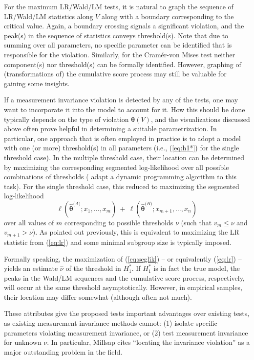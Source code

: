 \documentclass[man]{apa}
\begin{document}
For the maximum LR/Wald/LM tests, it is natural to graph the sequence of LR/Wald/LM
statistics along $V$ along with a boundary corresponding to the critical value.
Again, a boundary crossing signals a significant violation, and the peak(s) in the
sequence of statistics conveys threshold(s). Note that due to summing over all
parameters, no specific parameter can be identified that is responsible for the
violation. Similarly, for the Cram\'{e}r-von Mises test neither component(s) nor threshold(s)
can be formally identified. However, graphing of (transformations of) the cumulative
score process may still be valuable for gaining some insights.

If a measurement invariance violation is detected by any of the tests,
one may want to incorporate it into the model to account for it. How this should
be done typically depends on the type of violation ${\bm \theta}(V)$, and the visualizations
discussed above often prove helpful in determining a suitable parametrization.
In particular, one approach that is often employed in practice is to adopt a model
with one (or more) threshold(s) in all parameters (i.e., (\ref{eq:h1*}) for the
single threshold case). In the multiple threshold case, their location can
be determined by maximizing the corresponding segmented log-likelihood over all
possible combinations of thresholds ( adapt a dynamic programming
algorithm to this task). For the single threshold case, this reduced to
maximizing the segmented log-likelihood
\begin{equation} \label{eq:seglik}
  \ell(\hat {\bm \theta}^{({A)}}; x_1, \dots, x_m) ~+~ \ell(\hat {\bm \theta}^{({B)}}; x_{m+1}, \dots, x_n)
\end{equation}
over all values of $m$ corresponding to possible thresholds $\nu$ (such that $v_m \le \nu$ and
$v_{m+1} > \nu$). As pointed out previously, this is equivalent to maximizing the LR statistic
from (\ref{eq:lr}) and some minimal subgroup size is typically imposed.

Formally speaking, the maximization of (\ref{eq:seglik}) -- or equivalently (\ref{eq:lr}) --
yields an estimate $\hat \nu$ of the threshold in $H_1^*$. If $H_1^*$ is in fact the true model,
the peaks in the Wald/LM sequences and the cumulative score process, respectively, will occur at the
same threshold asymptotically. However, in empirical samples, their location may differ somewhat
(although often not much).

These attributes give the proposed tests important advantages over
existing tests, as existing measurement invariance methods cannot:
(1) isolate specific parameters violating measurement invariance, or
(2) test measurement invariance for unknown $\nu$. 
In particular, Millsap \citeyear{Mil05} cites
``locating the invariance violation'' as a major outstanding problem
in the field.
\end{document}
